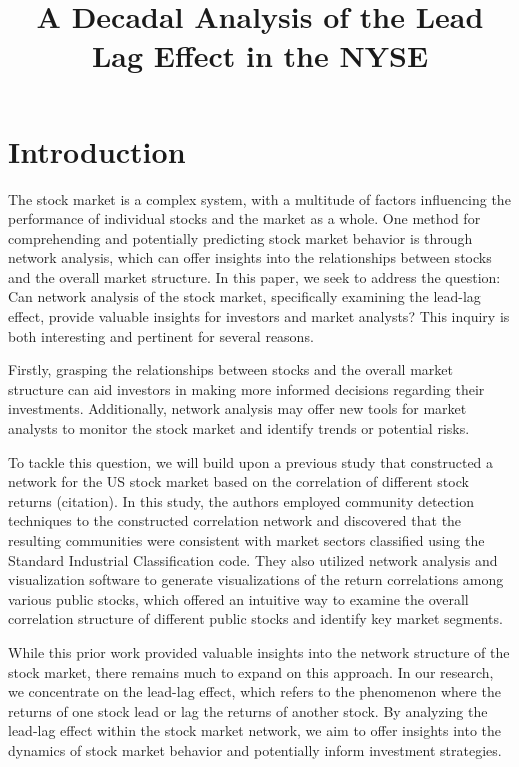 \documentclass{article}
\title{A Decadal Analysis of the Lead Lag Effect in the NYSE}
\begin{document}
\maketitle




\section{Introduction}



The stock market is a complex system, with a multitude of factors influencing the performance of individual stocks and the market as a whole. One method for comprehending and potentially predicting stock market behavior is through network analysis, which can offer insights into the relationships between stocks and the overall market structure. In this paper, we seek to address the question: Can network analysis of the stock market, specifically examining the lead-lag effect, provide valuable insights for investors and market analysts? This inquiry is both interesting and pertinent for several reasons.

Firstly, grasping the relationships between stocks and the overall market structure can aid investors in making more informed decisions regarding their investments. Additionally, network analysis may offer new tools for market analysts to monitor the stock market and identify trends or potential risks.

To tackle this question, we will build upon a previous study that constructed a network for the US stock market based on the correlation of different stock returns (citation). In this study, the authors employed community detection techniques to the constructed correlation network and discovered that the resulting communities were consistent with market sectors classified using the Standard Industrial Classification  code. They also utilized network analysis and visualization software to generate visualizations of the return correlations among various public stocks, which offered an intuitive way to examine the overall correlation structure of different public stocks and identify key market segments.

While this prior work provided valuable insights into the network structure of the stock market, there remains much to expand on this approach. In our research, we  concentrate on the lead-lag effect, which refers to the phenomenon where the returns of one stock lead or lag the returns of another stock. By analyzing the lead-lag effect within the stock market network, we aim to offer insights into the dynamics of stock market behavior and potentially inform investment strategies.
\end{document}
